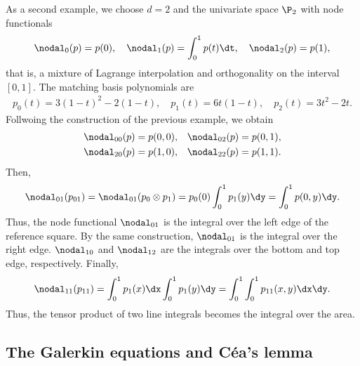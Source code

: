 \begin{example}
  As a second example, we choose $d=2$ and the univariate space $\P_2$ with node functionals
  \begin{gather}
    \nodal_0(p) = p(0),
    \quad \nodal_1(p) = \int_0^1 p(t) \dt,
    \quad \nodal_2(p) = p(1),
  \end{gather}
  that is, a mixture of Lagrange interpolation and orthogonality on
  the interval $[0,1]$. The matching basis polynomials are
  \begin{gather}
    p_0(t) = 3(1-t)^2 - 2(1-t),
    \quad p_1(t) = 6 t(1-t),
    \quad p_2(t) = 3t^2-2t.
  \end{gather}
  Follwoing the construction of the previous example, we obtain
  \begin{gather}
    \begin{aligned}
    \nodal_{00}(p) &= p(0,0),
    &\nodal_{02}(p) &= p(0,1),\\
    \nodal_{20}(p) &= p(1,0),
    &\nodal_{22}(p) &= p(1,1).
    \end{aligned}
  \end{gather}
  Then,
  \begin{gather}
    \nodal_{01}(p_{01}) = \nodal_{01}(p_0\otimes p_1)
    = p_0(0)\int_0^1 p_1(y)\dy
    = \int_0^1 p(0,y) \dy.
  \end{gather}
  Thus, the node functional $\nodal_{01}$ is the integral over the
  left edge of the reference square. By the same construction,
  $\nodal_{01}$ is the integral over the right edge. $\nodal_{10}$ and
  $\nodal_{12}$ are the integrals over the bottom and top edge,
  respectively. Finally,
  \begin{gather}
    \nodal_{11}(p_{11})
    = \int_0^1 p_1(x)\dx \int_0^1 p_1(y) \dy
    = \int_0^1\int_0^1 p_{11}(x,y) \dx\dy.
  \end{gather}
  Thus, the tensor product of two line integrals becomes the integral
  over the area.
\end{example}



\subsection{The Galerkin equations and Céa's lemma}

